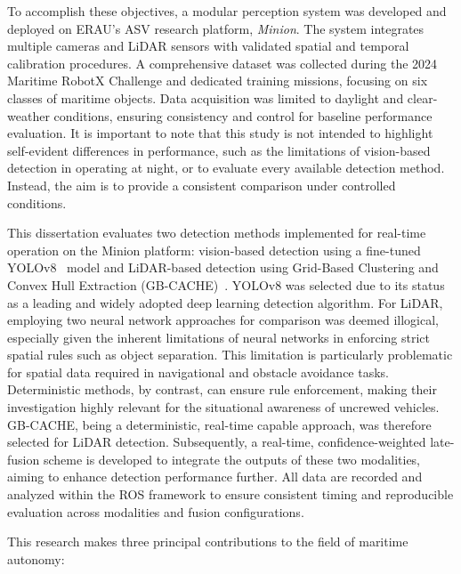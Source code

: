 \documentclass{erauthesis}
\begin{document}
To accomplish these objectives, a modular perception system was developed and deployed on \ac{ERAU}’s \ac{ASV} research platform, \textit{Minion}.
The system integrates multiple cameras and \ac{LiDAR} sensors with validated spatial and temporal calibration procedures.
A comprehensive dataset was collected during the 2024 Maritime RobotX Challenge and dedicated training missions, focusing on six classes of maritime objects. 
Data acquisition was limited to daylight and clear-weather conditions, ensuring consistency and control for baseline performance evaluation.
It is important to note that this study is not intended to highlight self-evident differences in performance, such as the limitations of vision-based detection in operating at night, or to evaluate every available detection method.
Instead, the aim is to provide a consistent comparison under controlled conditions. 

This dissertation evaluates two detection methods implemented for real-time operation on the Minion platform: vision-based detection using a fine-tuned YOLOv8~\cite{redmon2016} model and LiDAR-based detection using Grid-Based Clustering and Convex Hull Extraction (GB-CACHE)~\cite{coyleE}.
YOLOv8 was selected due to its status as a leading and widely adopted deep learning detection algorithm. 
For LiDAR, employing two neural network approaches for comparison was deemed illogical, especially given the inherent limitations of neural networks in enforcing strict spatial rules such as object separation. 
This limitation is particularly problematic for spatial data required in navigational and obstacle avoidance tasks. 
Deterministic methods, by contrast, can ensure rule enforcement, making their investigation highly relevant for the situational awareness of uncrewed vehicles.
GB-CACHE, being a deterministic, real-time capable approach, was therefore selected for LiDAR detection. 
Subsequently, a real-time, confidence-weighted late-fusion scheme is developed to integrate the outputs of these two modalities, aiming to enhance detection performance further.
All data are recorded and analyzed within the \ac{ROS} framework to ensure consistent timing and reproducible evaluation across modalities and fusion configurations.

This research makes three principal contributions to the field of maritime autonomy:
\end{document}
